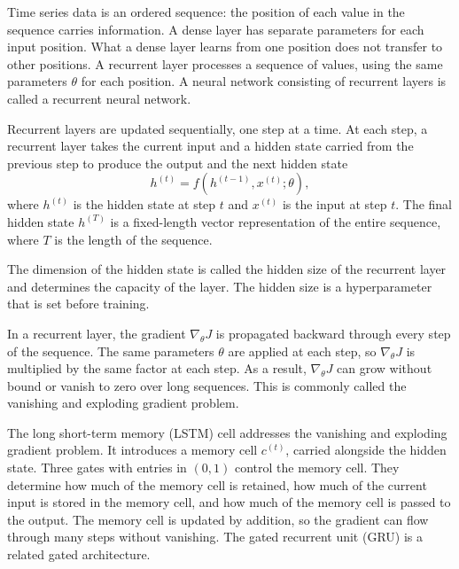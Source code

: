 Time series data is an ordered sequence: the position of each value in the sequence carries information. A dense layer has separate parameters for each input position. What a dense layer learns from one position does not transfer to other positions. A recurrent layer processes a sequence of values, using the same parameters $\theta$ for each position. A neural network consisting of recurrent layers is called a recurrent neural network. 

Recurrent layers are updated sequentially, one step at a time. At each step, a recurrent layer takes the current input and a hidden state carried from the previous step to produce the output and the next hidden state
\begin{equation}
h^{(t)} = f\!\left(h^{(t-1)}, x^{(t)}; \theta\right),
\end{equation}
where $h^{(t)}$ is the hidden state at step $t$ and $x^{(t)}$ is the input at step $t$. The final hidden state $h^{(T)}$ is a fixed-length vector representation of the entire sequence, where $T$ is the length of the sequence.

The dimension of the hidden state is called the hidden size of the recurrent layer and determines the capacity of the layer. The hidden size is a hyperparameter that is set before training.

In a recurrent layer, the gradient $\nabla_{\theta}J$ is propagated backward through every step of the sequence. The same parameters $\theta$ are applied at each step, so $\nabla_{\theta}J$ is multiplied by the same factor at each step. As a result, $\nabla_{\theta}J$ can grow without bound or vanish to zero over long sequences. This is commonly called the  vanishing and exploding gradient problem.

The long short-term memory (LSTM) cell \parencite{hochreiterLongShortTermMemory1997} addresses the vanishing and exploding gradient problem. It introduces a memory cell $c^{(t)}$, carried alongside the hidden state. Three gates with entries in $(0, 1)$ control the memory cell. They determine how much of the memory cell is retained, how much of the current input is stored in the memory cell, and how much of the memory cell is passed to the output. The memory cell is updated by addition, so the gradient can flow through many steps without vanishing. The gated recurrent unit (GRU) \parencite{choLearningPhraseRepresentations2014} is a related gated architecture.